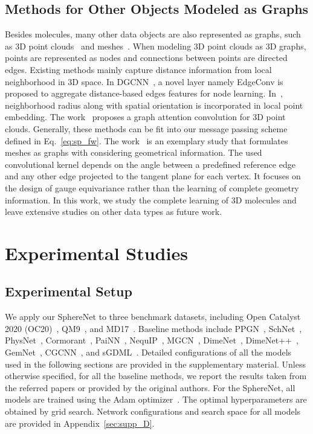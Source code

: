 \documentclass{article}
\begin{document}
\subsection{Methods for Other Objects Modeled as Graphs}
\textcolor{COLOR}{Besides molecules,
many other data objects are also represented as graphs, such as 3D point clouds~\citep{guo2020deep,simonovsky2017dynamic,shen2018mining,landrieu2018large} and meshes~\citep{bronstein2021geometric,de2020gauge,perraudin2019deepsphere}.}
When modeling 3D point clouds as 3D graphs,
points are represented as nodes and connections between points are directed edges. Existing methods mainly capture distance information from local neighborhood in 3D space.
In DGCNN~\citep{wang2019dynamic}, a novel layer namely EdgeConv is proposed to aggregate
distance-based edges features for node learning.
In~\cite{landrieu2019point}, neighborhood radius along with spatial orientation
is incorporated in local point embedding.
The work~\cite{wang2019graph} proposes a graph attention convolution for 3D point clouds.
Generally, these methods can be fit into our message passing scheme defined in Eq.~\ref{eq:sp_fw}.
\textcolor{COLOR}{
The work~\cite{de2020gauge} is an exemplary study that
formulates meshes as graphs with considering geometrical information. 
The used convolutional kernel depends on the angle 
between a predefined reference edge and any other edge projected to the tangent plane for each vertex. It focuses on the design of gauge equivariance rather than the learning of complete geometry information.
In this work, we study the complete learning of 3D molecules
and leave extensive studies
on other data types as future work.}


\section{Experimental Studies}
\subsection{Experimental Setup} \label{sec: setup}
We apply our SphereNet to three benchmark datasets, including 
Open Catalyst 2020 (OC20)~\citep{chanussot2020open}, QM9~\citep{ramakrishnan2014quantum}, and MD17~\citep{chmiela2017machine}.
Baseline methods include 
PPGN~\citep{maron2019provably},
SchNet~\citep{schutt2017schnet},
PhysNet~\citep{unke2019physnet},
Cormorant~\citep{anderson2019cormorant},
PaiNN~\citep{schutt2021equivariant},
NequIP~\citep{batzner2021se},
MGCN~\citep{lu2019molecular},
DimeNet~\citep{klicpera_dimenet_2020}, DimeNet++~\citep{klicpera_dimenetpp_2020},
GemNet~\citep{klicpera2021gemnet}, CGCNN~\citep{xie2018crystal}, and sGDML~\citep{chmiela2018towards}.
Detailed configurations of all the models used in the following sections are provided in the supplementary material.
Unless otherwise specified, for all the baseline methods, we report the results taken from the referred papers
or provided by the original authors.
For the SphereNet,
all models are trained using the Adam
optimizer~\citep{kingma2014adam}. 
The optimal hyperparameters are obtained by grid search.
Network configurations and 
search space for all models are provided in
Appendix~\ref{sec:supp_D}.
\end{document}
